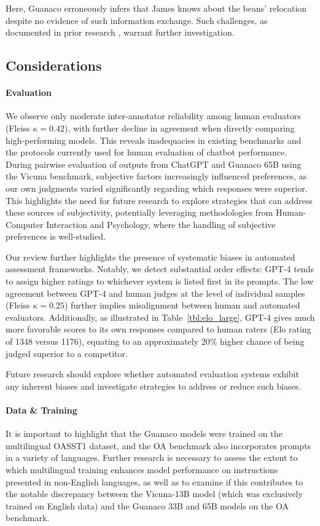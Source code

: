 Here, {Guanaco} erroneously infers that James knows about the beans' relocation despite no evidence of such information exchange. Such challenges, as documented in prior research \cite{sap2022neural}, warrant further investigation.

\subsection{Considerations}
\label{ssec:considerations}

\paragraph{Evaluation}

We observe only moderate inter-annotator reliability among human evaluators (Fleiss $\kappa=0.42$), with further decline in agreement when directly comparing high-performing models. This reveals inadequacies in existing benchmarks and the protocols currently used for human evaluation of chatbot performance. During pairwise evaluation of outputs from ChatGPT and {Guanaco} 65B using the Vicuna benchmark, subjective factors increasingly influenced preferences, as our own judgments varied significantly regarding which responses were superior. This highlights the need for future research to explore strategies that can address these sources of subjectivity, potentially leveraging methodologies from Human-Computer Interaction and Psychology, where the handling of subjective preferences is well-studied.

Our review further highlights the presence of systematic biases in automated assessment frameworks. Notably, we detect substantial order effects: GPT-4 tends to assign higher ratings to whichever system is listed first in its prompts. The low agreement between GPT-4 and human judges at the level of individual samples (Fleiss $\kappa=0.25$) further implies misalignment between human and automated evaluators. Additionally, as illustrated in Table~\ref{tbl:elo_large}, GPT-4 gives much more favorable scores to its own responses compared to human raters (Elo rating of 1348 versus 1176), equating to an approximately 20\% higher chance of being judged superior to a competitor.

Future research should explore whether automated evaluation systems exhibit any inherent biases and investigate strategies to address or reduce such biases.

\paragraph{Data \& Training} It is important to highlight that the {Guanaco} models were trained on the multilingual OASST1 dataset, and the OA benchmark also incorporates prompts in a variety of languages. Further research is necessary to assess the extent to which multilingual training enhances model performance on instructions presented in non-English languages, as well as to examine if this contributes to the notable discrepancy between the Vicuna-13B model (which was exclusively trained on English data) and the {Guanaco} 33B and 65B models on the OA benchmark.

